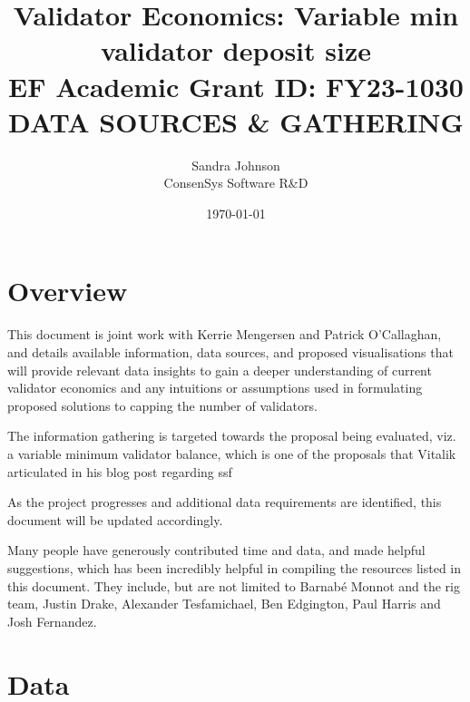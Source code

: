 \documentclass[UTF8]{article}
\title{Validator Economics: Variable min validator deposit size\\
\vspace{4pt}
\large EF Academic Grant ID: FY23-1030\\
\vspace{16pt}
DATA SOURCES \& GATHERING}
\author{Sandra Johnson\\
ConsenSys Software R\&D}
\date{\today}                                           %
\begin{document}
\maketitle



\section{Overview}
This document is joint work with Kerrie Mengersen and Patrick O'Callaghan, and details available information, data sources, and proposed visualisations that will provide relevant data insights to gain a deeper understanding of current validator economics and any intuitions or assumptions used in formulating proposed solutions to capping the number of validators. 

The information gathering is targeted towards the proposal being evaluated, viz. a variable minimum validator balance, which is one of the proposals that Vitalik articulated in his blog post regarding \gls{ssf} 

As the project progresses and additional data requirements are identified, this document will be updated accordingly.

Many people have generously contributed time and data, and made helpful suggestions, which has been incredibly helpful in compiling the resources listed in this document. They include, but are not limited to Barnabé Monnot and the \gls{rig} team, Justin Drake, Alexander Tesfamichael, Ben Edgington, Paul Harris and Josh Fernandez.



\section{Data}
\label{sec:data}

\end{document}

